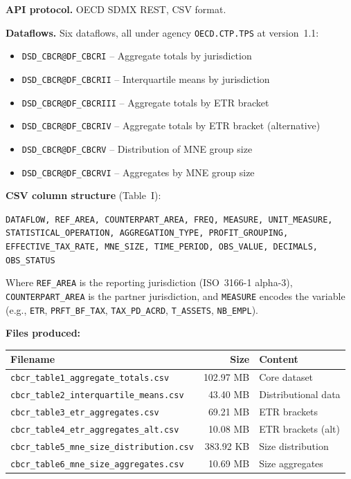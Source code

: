 \documentclass[12pt,a4paper]{article}
\begin{document}
\textbf{API protocol.}
OECD SDMX REST, CSV format.

\textbf{Dataflows.}
Six dataflows, all under agency \texttt{OECD.CTP.TPS} at version~1.1:
\begin{itemize}[nosep]
    \item \texttt{DSD\_CBCR@DF\_CBCRI} -- Aggregate totals by jurisdiction
    \item \texttt{DSD\_CBCR@DF\_CBCRII} -- Interquartile means by jurisdiction
    \item \texttt{DSD\_CBCR@DF\_CBCRIII} -- Aggregate totals by ETR bracket
    \item \texttt{DSD\_CBCR@DF\_CBCRIV} -- Aggregate totals by ETR bracket (alternative)
    \item \texttt{DSD\_CBCR@DF\_CBCRV} -- Distribution of MNE group size
    \item \texttt{DSD\_CBCR@DF\_CBCRVI} -- Aggregates by MNE group size
\end{itemize}

\textbf{CSV column structure} (Table~I):
\begin{center}
\small
\texttt{DATAFLOW, REF\_AREA, COUNTERPART\_AREA, FREQ, MEASURE, UNIT\_MEASURE,}\\
\texttt{STATISTICAL\_OPERATION, AGGREGATION\_TYPE, PROFIT\_GROUPING,}\\
\texttt{EFFECTIVE\_TAX\_RATE, MNE\_SIZE, TIME\_PERIOD, OBS\_VALUE, DECIMALS, OBS\_STATUS}
\end{center}

\noindent
Where \texttt{REF\_AREA} is the reporting jurisdiction (ISO~3166-1 alpha-3), \texttt{COUNTERPART\_AREA} is the partner jurisdiction, and \texttt{MEASURE} encodes the variable (e.g., \texttt{ETR}, \texttt{PRFT\_BF\_TAX}, \texttt{TAX\_PD\_ACRD}, \texttt{T\_ASSETS}, \texttt{NB\_EMPL}).

\textbf{Files produced:}

\begin{table}[H]
\centering
\small
\begin{tabular}{lrl}
\toprule
\textbf{Filename} & \textbf{Size} & \textbf{Content} \\
\midrule
\texttt{cbcr\_table1\_aggregate\_totals.csv} & 102.97 MB & Core dataset \\
\texttt{cbcr\_table2\_interquartile\_means.csv} & 43.40 MB & Distributional data \\
\texttt{cbcr\_table3\_etr\_aggregates.csv} & 69.21 MB & ETR brackets \\
\texttt{cbcr\_table4\_etr\_aggregates\_alt.csv} & 10.08 MB & ETR brackets (alt) \\
\texttt{cbcr\_table5\_mne\_size\_distribution.csv} & 383.92 KB & Size distribution \\
\texttt{cbcr\_table6\_mne\_size\_aggregates.csv} & 10.69 MB & Size aggregates \\
\bottomrule
\end{tabular}
\end{table}
\end{document}
